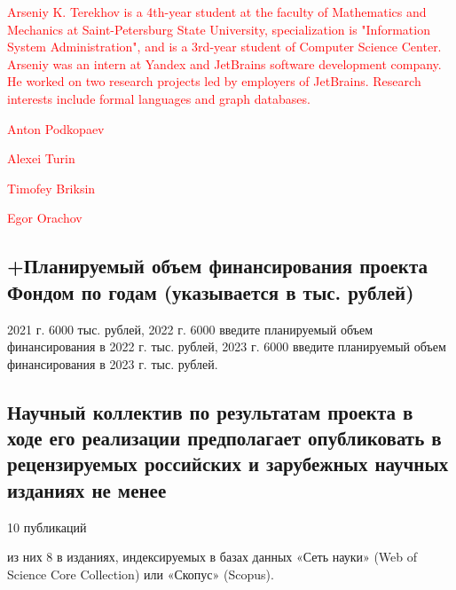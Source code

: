 \documentclass[12pt]{article}  %
\theoremstyle{remark}
\newcommand{\checkme}[1]{\textcolor{red}{#1}}
\begin{document}
\checkme{Arseniy K. Terekhov is a 4th-year student at the faculty of Mathematics and Mechanics at Saint-Petersburg State University, specialization is "Information System Administration", and is a 3rd-year student of Computer Science Center. Arseniy was an intern at Yandex and JetBrains software development company. He worked on two research projects led by employers of JetBrains. Research interests include formal languages and graph databases.}

\checkme{Anton Podkopaev}

\checkme{Alexei Turin}

\checkme{Timofey Briksin}

\checkme{Egor Orachov}


\subsection{+Планируемый объем финансирования проекта Фондом по годам (указывается в тыс. рублей)}
2021 г. 6000 тыс. рублей,
2022 г. 6000 введите планируемый объем финансирования в 2022 г. тыс. рублей,
2023 г. 6000 введите планируемый объем финансирования в 2023 г. тыс. рублей.

\subsection{Научный коллектив по результатам проекта в ходе его реализации предполагает опубликовать в рецензируемых российских и зарубежных научных изданиях не менее}

10 публикаций

из них 8 в изданиях, индексируемых в базах данных «Сеть науки» (Web of Science Core Collection) или «Скопус» (Scopus).
\end{document}
